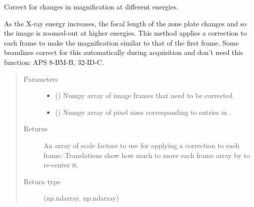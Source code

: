 \documentclass[letterpaper,10pt,english]{sphinxmanual}
\begin{document}
\begin{fulllineitems}
\label{\detokenize{xanespy:xanespy.importers.magnification_correction}}
Correct for changes in magnification at different energies.

As the X-ray energy increases, the focal length of the zone plate
changes and so the image is zoomed-out at higher energies. This
method applies a correction to each frame to make the
magnification similar to that of the first frame. Some beamlines
correct for this automatically during acquisition and don’t need
this function: APS 8-BM-B, 32-ID-C.
\begin{quote}\begin{description}
\item[{Parameters}] \leavevmode\begin{itemize}
\item {} 
 () \textendash{} Numpy array of image frames that need to be corrected.

\item {} 
 () \textendash{} Numpy array of pixel sizes corresponding to entries in .

\end{itemize}

\item[{Returns}] \leavevmode
{} \textendash{} An array of scale factors to use for applying a correction to
each frame. Translations show how much to move each frame array by to re-center it.

\item[{Return type}] \leavevmode
(np.ndarray, np.ndarray)

\end{description}\end{quote}

\end{fulllineitems}

\end{document}
